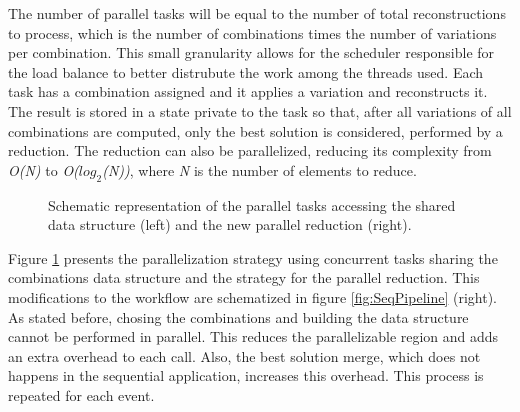 The number of parallel tasks will be equal to the number of total reconstructions to process, which is the number of combinations times the number of variations per combination. This small granularity allows for the scheduler responsible for the load balance to better distrubute the work among the threads used. Each task has a combination assigned and it applies a variation and reconstructs it. The result is stored in a state private to the task so that, after all variations of all combinations are computed, only the best solution is considered, performed by a reduction. The reduction can also be parallelized, reducing its complexity from \textit{O(N)} to \textit{O($log_{2}$(N))}, where \textit{N} is the number of elements to reduce.

\begin{figure}[!htp]
	\begin{center}
		\caption{Schematic representation of the parallel tasks accessing the shared data structure (left) and the new parallel reduction (right).}
		\label{fig:ParallelMethodology}
	\end{center}
\end{figure}

Figure \ref{fig:ParallelMethodology} presents the parallelization strategy using concurrent tasks sharing the combinations data structure and the strategy for the parallel reduction. This modifications to the workflow are schematized in figure \ref{fig:SeqPipeline} (right). As stated before, chosing the combinations and building the data structure cannot be performed in parallel. This reduces the parallelizable region and adds an extra overhead to each \ttDilepKinFit call. Also, the best solution merge, which does not happens in the sequential application, increases this overhead. This process is repeated for each event.

